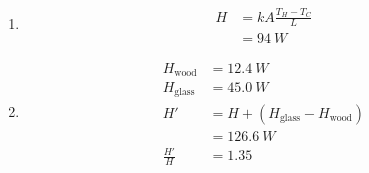 \documentclass{article}
\begin{document}
\setcounter{subsubsection}{98}
\subsubsection{}

\begin{enumerate}
  \item

        \begin{align*}
          H & = k A \frac{T_H - T_C}{L} \\
            & = \qty{94}{W}
        \end{align*}

  \item

        \begin{align*}
          H_\text{wood}  & = \qty{12.4}{W}                        \\
          H_\text{glass} & = \qty{45.0}{W}                        \\
          H'             & = H + (H_\text{glass} - H_\text{wood}) \\
                         & = \qty{126.6}{W}                       \\
          \frac{H'}{H}   & = 1.35
        \end{align*}
\end{enumerate}

\setcounter{subsubsection}{104}
\subsubsection{}
\end{document}

